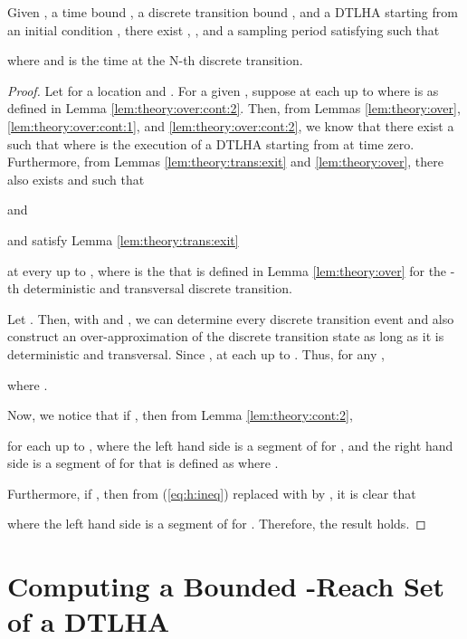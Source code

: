 \begin{thm} \label{thm:theory:thm}
Given , a time bound , a discrete transition bound , and a DTLHA  starting from an initial condition , there exist , , and a sampling period  satisfying  such that 

where  and  is the time at the N-th discrete transition. 
\end{thm}
\begin{proof}
Let  for a location  and .
For a given , suppose  at each  up to  where  is as defined in Lemma \ref{lem:theory:over:cont:2}.
Then, from Lemmas \ref{lem:theory:over}, \ref{lem:theory:over:cont:1}, and \ref{lem:theory:over:cont:2}, we know that there exist a  such that  where  is the execution of a DTLHA  starting from  at time zero.
Furthermore, from Lemmas \ref{lem:theory:trans:exit} and \ref{lem:theory:over}, there also exists  and  such that 
\begin{inparaenum}[(i)]
	\item  and
	\item  and  satisfy Lemma \ref{lem:theory:trans:exit}
\end{inparaenum}
at every  up to , where  is the  that is defined in Lemma \ref{lem:theory:over} for the -th deterministic and transversal discrete transition.

Let .
Then, with  and , we can determine every discrete transition event and also construct an over-approximation of the discrete transition state as long as it is deterministic and transversal.
Since ,  at each  up to .
Thus, for any , 

where .

Now, we notice that if , then from Lemma \ref{lem:theory:cont:2},

for each  up to , where the left hand side is a segment of  for , and the right hand side is a segment of  for  that is defined as  where .

Furthermore, if , then from (\ref{eq:h:ineq}) replaced with  by , it is clear that 

where the left hand side is a segment of  for .
Therefore, the result holds.
\end{proof}






\section{Computing a Bounded -Reach Set of a DTLHA}  \label{sec:cond}

